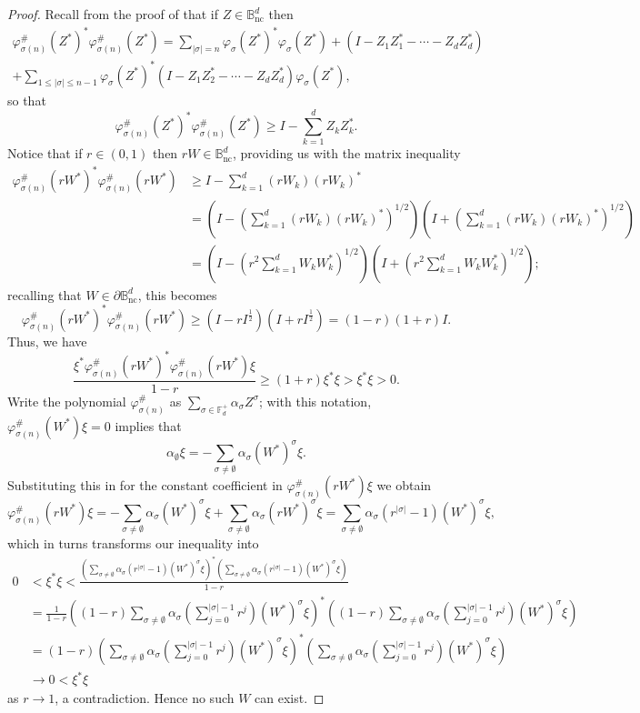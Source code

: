 \documentclass[11pt,reqno]{amsart}
\def\a{\alpha}
\def\p{\varphi}
\def\s{\sigma}
\def\BB{\mathbb{B}}
\def\FF{\mathbb{F}}
\def\nc{\mathrm{nc}}
\theoremstyle{definition}
\numberwithin{equation}{section}
\begin{document}
\begin{proof}
    Recall from the proof of  that if \(Z \in \BB^d_\nc\) then
    \begin{multline*}
        \p_{\s(n)}^\#(Z^*)^* \p_{\s(n)}^\#(Z^*) = \sum_{\lvert \s \rvert = n} \p_\s(Z^*)^* \p_\s(Z^*) + (I - Z_1Z_1^* - \cdots - Z_dZ_d^*)  \\ + \sum_{1 \leq \lvert \s \rvert \leq n-1} \p_\s(Z^*)^*(I - Z_1Z_2^* - \cdots - Z_dZ_d^*)\p_\s(Z^*),
    \end{multline*}
    so that
    \[
        \p_{\s(n)}^\#(Z^*)^* \p_{\s(n)}^\#(Z^*) \geq I - \sum_{k=1}^d Z_kZ_k^*.
    \]
    Notice that if \(r \in (0,1)\) then \(rW \in \BB^d_\nc\), providing us with the matrix inequality
    \begin{align*}
        \p_{\s(n)}^\#(rW^*)^* \p_{\s(n)}^\#(rW^*) & \geq I - \sum_{k=1}^d (rW_k)(rW_k)^* \\
        & = \left(I - \left(\sum_{k=1}^d (rW_k)(rW_k)^*\right)^{1/2}\right)\left(I + \left(\sum_{k=1}^d (rW_k)(rW_k)^*\right)^{1/2}\right) \\
        & = \left(I - \left(r^2\sum_{k=1}^d W_kW_k^*\right)^{1/2}\right)\left(I + \left(r^2\sum_{k=1}^d W_kW_k^*\right)^{1/2}\right);
    \end{align*}
    recalling that \(W \in \partial \BB^d_\nc\), this becomes
    \[
        \p_{\s(n)}^\#(rW^*)^* \p_{\s(n)}^\#(rW^*) \geq (I - rI^{\frac12})(I + rI^{\frac12}) = (1-r)(1+r)I.
    \]
Thus, we have
    \[
        \frac{\xi^* \p_{\s(n)}^\#(rW^*)^* \p_{\s(n)}^\#(rW^*) \xi}{1-r} \geq (1+r)\xi^* \xi > \xi^* \xi > 0.
    \]
    Write the polynomial \(\p_{\s(n)}^\#\) as \(\sum_{\s \in \FF_d^+} \a_\s Z^\s\); with this notation, \(\p_{\s(n)}^\#(W^*)\xi = 0\) implies that 
    \[
        \a_\emptyset \xi = - \sum_{\s \neq \emptyset} \a_\s (W^*)^\s \xi.
    \]
    Substituting this in for the constant coefficient in \(\p_{\s(n)}^\#(rW^*)\xi\) we obtain
    \[
        \p_{\s(n)}^\#(rW^*)\xi = - \sum_{\s \neq \emptyset} \a_\s (W^*)^\s \xi + \sum_{\s \neq \emptyset} \a_\s (rW^*)^\s \xi = \sum_{\s\neq\emptyset} \a_\s (r^{\lvert \s \rvert} - 1) (W^*)^{\s} \xi,
    \]
    which in turns transforms our inequality into
    \begin{align*}
        0 & < \xi^* \xi < \frac{\left(\sum_{\s\neq\emptyset} \a_\s (r^{\lvert \s \rvert} - 1) (W^*)^{\s} \xi\right)^*\left(\sum_{\s\neq\emptyset} \a_\s (r^{\lvert \s \rvert} - 1) (W^*)^{\s} \xi\right)}{1-r} \\
        & = \frac{1}{1-r}\left((1-r)\sum_{\s\neq\emptyset} \a_\s \left(\sum_{j=0}^{\lvert \s \rvert - 1} r^j \right) (W^*)^{\s} \xi\right)^*\left((1-r)\sum_{\s\neq\emptyset} \a_\s \left(\sum_{j=0}^{\lvert \s \rvert - 1} r^j \right) (W^*)^{\s} \xi\right) \\
        & = (1-r)\left(\sum_{\s\neq\emptyset} \a_\s \left(\sum_{j=0}^{\lvert \s \rvert - 1} r^j \right) (W^*)^{\s} \xi\right)^*\left(\sum_{\s\neq\emptyset} \a_\s \left(\sum_{j=0}^{\lvert \s \rvert - 1} r^j \right) (W^*)^{\s} \xi\right) \\
        & \to 0 < \xi^*\xi
    \end{align*}
    as \(r \to 1\), a contradiction. Hence no such \(W\) can exist.
\end{proof}
\end{document}
